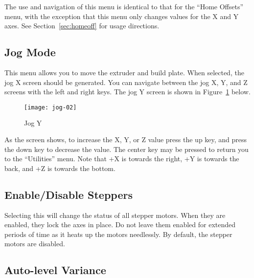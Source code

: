 The use and navigation of this menu is identical to that for the ``Home Offsets'' menu, with the exception that this menu only changes values for the X and Y axes.  See Section~\ref{sec:homeoff} for usage directions.


\subsection{Jog Mode} \label{sec:jog}

This menu allows you to move the extruder and build plate.  When selected, the jog X screen should be generated.  You can navigate between the jog X, Y, and Z screens with the left and right keys.  The jog Y screen is shown in Figure~\ref{fig:jog} below.

\begin{figure}[!htbp]
  \centering
    \texttt{[image: jog-02]}
    \caption{Jog Y}
  \label{fig:jog}
\end{figure}

As the screen shows, to increase the X, Y, or Z value press the up key, and press the down key to decrease the value.  The center key may be pressed to return you to the ``Utilities'' menu.  Note that +X is towards the right, +Y is towards the back, and +Z is towards the bottom.


\subsection{Enable/Disable Steppers} \label{sec:steppers-enable}

Selecting this will change the status of all stepper motors.  When they are enabled, they lock the axes in place.  Do not leave them enabled for extended periods of time as it heats up the motors needlessly.  By default, the stepper motors are disabled.


\subsection{Auto-level Variance} \label{sec:alevel-variance}

